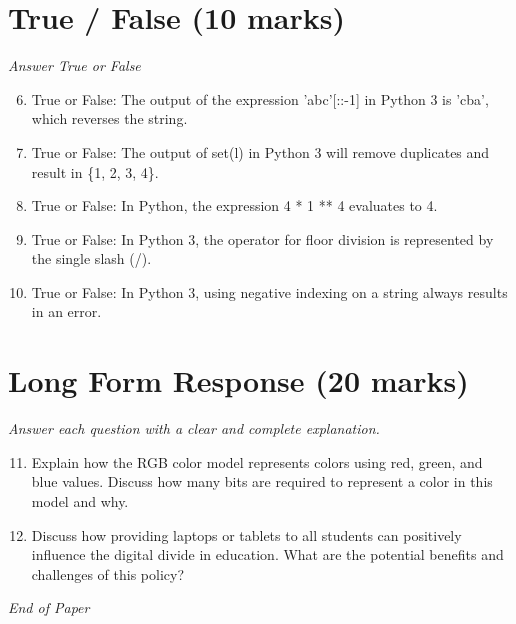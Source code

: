 \documentclass[12pt]{article}
\begin{document}
\section*{True / False (10 marks)}
\textit{Answer True or False}
\begin{enumerate}[label=\arabic*.]
\setcounter{enumi}{5}
\item True or False: The output of the expression 'abc'[::-1] in Python 3 is 'cba', which reverses the string.
\item True or False: The output of set(l) in Python 3 will remove duplicates and result in \{1, 2, 3, 4\}.
\item True or False: In Python, the expression 4 * 1 ** 4 evaluates to 4.
\item True or False: In Python 3, the operator for floor division is represented by the single slash (/).
\item True or False: In Python 3, using negative indexing on a string always results in an error.
\end{enumerate}

\section*{Long Form Response (20 marks)}
\textit{Answer each question with a clear and complete explanation.}
\begin{enumerate}[label=\arabic*.]
\setcounter{enumi}{10}
\item Explain how the RGB color model represents colors using red, green, and blue values. Discuss how many bits are required to represent a color in this model and why.
\item Discuss how providing laptops or tablets to all students can positively influence the digital divide in education. What are the potential benefits and challenges of this policy?
\end{enumerate}

\vfill
\noindent\textit{End of Paper}
\end{document}
